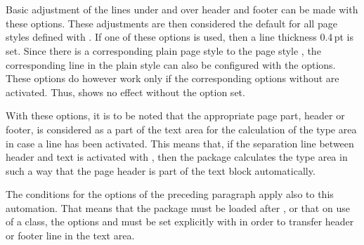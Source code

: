 \begin{Declaration}
  \\
  \\
  \\
  \\
  \\
  \\
  \\
\end{Declaration}%
%
%
%
%
Basic adjustment of the lines under and over header and footer can be
made with these options.  These adjustments are then considered the
default for all page styles defined with .  If one
of these options is used, then a line thickness 0.4\,pt is set.
Since there is a corresponding plain page style to the
page style , the corresponding line in the plain
style can also be configured with the  options.
These  options do however work only if the corresponding
options without  are activated.  Thus,
 shows no effect without the
 option set.

With these options, it is to be noted that the appropriate page part,
header or footer, is considered as a part of the text area for the
calculation of the type area in case a line has been activated.  This
means that, if the separation line between header and text is
activated with , then the package
 calculates the type area in such a way that the
page header is part of the text block automatically.

The conditions for the options of the preceding paragraph
apply also to this automation. That means that the package 
must be loaded after , or that on use of a {\KOMAScript}
class, the options  and  must be set
explicitly with  in order to transfer header or footer
line in the text area.%
%

